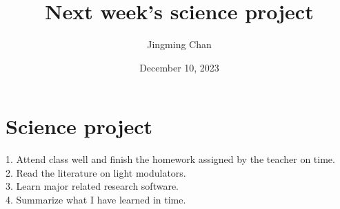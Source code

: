 \documentclass{article}
\title{Next week's science project}
\author{Jingming Chan}
\date{December 10, 2023}
\begin{document}
\maketitle

\section{Science project}
1. Attend class well and finish the homework assigned by the teacher on time.\\
2. Read the literature on light modulators.\\
3. Learn major related research software.\\
4. Summarize what I have learned in time.
\end{document}
